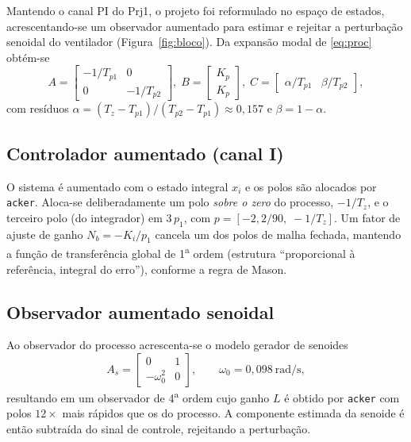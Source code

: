 \documentclass[a4paper]{ifacconf}
\begin{document}
Mantendo o canal PI do Prj1, o projeto foi reformulado no espaço de estados, acrescentando-se um
observador aumentado para estimar e rejeitar a perturbação senoidal do ventilador
(Figura~\ref{fig:bloco}). Da expansão modal de \eqref{eq:proc} obtém-se
\begin{equation}
A = \begin{bmatrix} -1/T_{p1} & 0\\ 0 & -1/T_{p2}\end{bmatrix},\;
B = \begin{bmatrix} K_p\\ K_p\end{bmatrix},\;
C = \begin{bmatrix} \alpha/T_{p1} & \beta/T_{p2}\end{bmatrix},
\end{equation}
com resíduos $\alpha = (T_z - T_{p1})/(T_{p2} - T_{p1}) \approx 0{,}157$ e $\beta = 1-\alpha$.

\subsection{Controlador aumentado (canal I)}
O sistema é aumentado com o estado integral $x_i$ e os polos são alocados por
\texttt{acker}. Aloca-se deliberadamente um polo \emph{sobre o zero} do processo, $-1/T_z$, e
o terceiro polo (do integrador) em $3\,p_1$, com $p = [-2{,}2/90,\; -1/T_z]$. Um fator de
ajuste de ganho $N_b = -K_i/p_1$ cancela um dos polos de malha fechada, mantendo a função de
transferência global de 1\textsuperscript{a} ordem (estrutura ``proporcional à referência,
integral do erro''), conforme a regra de Mason.

\subsection{Observador aumentado senoidal}
Ao observador do processo acrescenta-se o modelo gerador de senoides
\begin{equation}
A_s = \begin{bmatrix} 0 & 1\\ -\omega_0^2 & 0\end{bmatrix},\qquad \omega_0 = 0{,}098~\text{rad/s},
\end{equation}
resultando em um observador de 4\textsuperscript{a} ordem cujo ganho $L$ é obtido por
\texttt{acker} com polos $12\times$ mais rápidos que os do processo. A componente estimada da
senoide é então subtraída do sinal de controle, rejeitando a perturbação.
\end{document}
